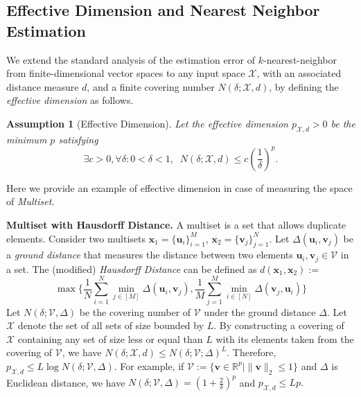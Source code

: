 \documentclass{article}
\newtheorem{assumption}{Assumption}
\newcommand{\R}{\mathbb{R}}
\newcommand{\X}{\mathcal{X}}
\newcommand{\V}{\mathcal{V}}
\newcommand{\1}{\mathbf{1}}
\newcommand{\bx}{\boldsymbol{x}}
\newcommand{\bu}{\boldsymbol{u}}
\newcommand{\bv}{\boldsymbol{v}}
\begin{document}
\subsection{Effective Dimension and Nearest Neighbor Estimation}

We extend the standard analysis of the estimation error of $k$-nearest-neighbor from finite-dimensional vector spaces to any input space $\X$, with an associated distance measure $d$, and a finite covering number $N(\delta; \X,d)$, by defining the \emph{effective dimension} as follows.

\begin{assumption}[Effective Dimension]\label{def:eff_dim}
Let the effective dimension $p_{\X,d}>0$ be the minimum $p$ satisfying
$$
\exists c>0, \forall \delta: 0< \delta < 1, \;\;N(\delta;\X,d)\leq c\left(\frac{1}{\delta}\right)^p.
$$
\end{assumption}

Here we provide an example of effective dimension in case of measuring the space of \emph{Multiset}.


\textbf{Multiset with Hausdorff Distance. } A multiset is a set that allows duplicate elements. Consider two multisets $\bx_1=\{\bu_i\}_{i=1}^M$, $\bx_2=\{\bv_j\}_{j=1}^N$. Let $\Delta(\bu_i,\bv_j)$ be a \emph{ground distance} that measures the distance between two elements $\bu_i,\bv_j\in\V$ in a set. The (modified) \emph{Hausdorff Distance} \cite{dubuisson1994modified} can be defined as $d(\bx_1,\bx_2):=$
\begin{equation}\label{HD}
\max\{\frac{1}{N}\sum_{i=1}^N \min_{j\in[M]}\Delta(\bu_i,\bv_j),\frac{1}{M}\sum_{j=1}^M\min_{i\in[N]}\Delta(\bv_j,\bu_i)\}
\end{equation}
Let $N(\delta;\V,\Delta)$ be the covering number of $\V$ under the ground distance $\Delta$. Let $\X$ denote the set of all sets of size bounded by $L$. By constructing a covering of $\X$ containing any set of size less or equal than $L$ with its elements taken from the covering of $\V$, we have
$
N(\delta;\X,d)\leq  N(\delta;\V;\Delta)^L.
$
Therefore,
$
p_{\X,d}\leq L\log N(\delta;\V,\Delta).
$
For example, if $\V:=\{\bv\in\R^{p}\mid \|\bv\|_2\leq 1\}$ and $\Delta$ is Euclidean distance, we have $N(\delta;\V,\Delta)=(1+\frac{2}{\delta})^p$ and 
$
p_{\X,d}\leq Lp.
$
\end{document}
